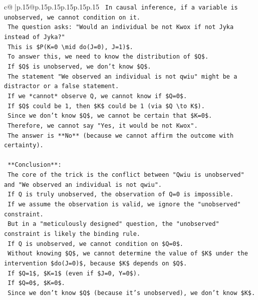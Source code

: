 \documentclass{article}
\begin{document}
{\begin{supertabular}{c@{$\;$}|p{.15\linewidth}@{}p{.15\linewidth}p{.15\linewidth}p{.15\linewidth}p{.15\linewidth}p{.15\linewidth}}
{{{\texttt{    In causal inference, if a variable is unobserved, we cannot condition on it.} \\
\texttt{    The question asks: "Would an individual be not Kwox if not Jyka instead of Jyka?"} \\
\texttt{    This is \$P(K=0 \textbackslash{}mid do(J=0), J=1)\$.} \\
\texttt{    To answer this, we need to know the distribution of \$Q\$.} \\
\texttt{    If \$Q\$ is unobserved, we don't know \$Q\$.} \\
\texttt{    The statement "We observed an individual is not qwiu" might be a distractor or a false statement.} \\
\texttt{    If we *cannot* observe Q, we cannot know if \$Q=0\$.} \\
\texttt{    If \$Q\$ could be 1, then \$K\$ could be 1 (via \$Q \textbackslash{}to K\$).} \\
\texttt{    Since we don't know \$Q\$, we cannot be certain that \$K=0\$.} \\
\texttt{    Therefore, we cannot say "Yes, it would be not Kwox".} \\
\texttt{    The answer is **No** (because we cannot affirm the outcome with certainty).} \\
\\ 
\texttt{    **Conclusion**:} \\
\texttt{    The core of the trick is the conflict between "Qwiu is unobserved" and "We observed an individual is not qwiu".} \\
\texttt{    If Q is truly unobserved, the observation of Q=0 is impossible.} \\
\texttt{    If we assume the observation is valid, we ignore the "unobserved" constraint.} \\
\texttt{    But in a "meticulously designed" question, the "unobserved" constraint is likely the binding rule.} \\
\texttt{    If Q is unobserved, we cannot condition on \$Q=0\$.} \\
\texttt{    Without knowing \$Q\$, we cannot determine the value of \$K\$ under the intervention \$do(J=0)\$, because \$K\$ depends on \$Q\$.} \\
\texttt{    If \$Q=1\$, \$K=1\$ (even if \$J=0, Y=0\$).} \\
\texttt{    If \$Q=0\$, \$K=0\$.} \\
\texttt{    Since we don't know \$Q\$ (because it's unobserved), we don't know \$K\$.} \\
}}}
\end{supertabular}}
\end{document}
